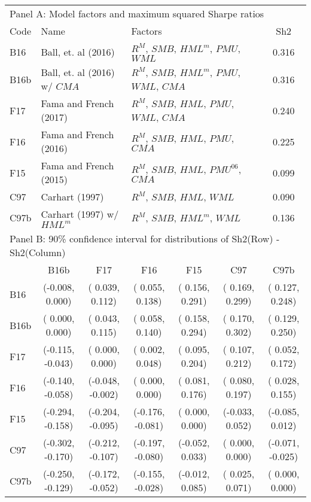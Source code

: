 
\begin{tabular}{lcccccc}
  \toprule
  \multicolumn{7}{l}{Panel A: Model factors and maximum squared Sharpe ratios} \\
  Code  & \multicolumn{2}{l}{Name}                         & \multicolumn{3}{l}{Factors}                                   & Sh2   \\
  B16   & \multicolumn{2}{l}{Ball, et. al (2016)}          & \multicolumn{3}{l}{$R^M$, $SMB$, $HML^m$, $PMU$, $WML$}        & 0.316 \\
  B16b  & \multicolumn{2}{l}{Ball, et. al (2016) w/ $CMA$} & \multicolumn{3}{l}{$R^M$, $SMB$, $HML^m$, $PMU$, $WML$, $CMA$} & 0.316 \\
  F17   & \multicolumn{2}{l}{Fama and French (2017)}       & \multicolumn{3}{l}{$R^M$, $SMB$, $HML$, $PMU$, $WML$, $CMA$}   & 0.240 \\
  F16   & \multicolumn{2}{l}{Fama and French (2016)}       & \multicolumn{3}{l}{$R^M$, $SMB$, $HML$, $PMU$, $CMA$}          & 0.225 \\
  F15   & \multicolumn{2}{l}{Fama and French (2015)}       & \multicolumn{3}{l}{$R^M$, $SMB$, $HML$, $PMU^{06}$, $CMA$}     & 0.099 \\
  C97   & \multicolumn{2}{l}{Carhart (1997)}               & \multicolumn{3}{l}{$R^M$, $SMB$, $HML$, $WML$}                 & 0.090 \\
  C97b  & \multicolumn{2}{l}{Carhart (1997) w/ $HML^m$}    & \multicolumn{3}{l}{$R^M$, $SMB$, $HML^m$, $WML$}               & 0.136 \\
  \midrule
  \multicolumn{7}{l}{Panel B: 90\% confidence interval for distributions of Sh2(Row) - Sh2(Column)} \\
        &        B16b      &        F17       &        F16       &        F15       &        C97       &        C97b      \\
  B16   & (-0.008,  0.000) & ( 0.039,  0.112) & ( 0.055,  0.138) & ( 0.156,  0.291) & ( 0.169,  0.299) & ( 0.127,  0.248) \\
  B16b  & ( 0.000,  0.000) & ( 0.043,  0.115) & ( 0.058,  0.140) & ( 0.158,  0.294) & ( 0.170,  0.302) & ( 0.129,  0.250) \\
  F17   & (-0.115, -0.043) & ( 0.000,  0.000) & ( 0.002,  0.048) & ( 0.095,  0.204) & ( 0.107,  0.212) & ( 0.052,  0.172) \\
  F16   & (-0.140, -0.058) & (-0.048, -0.002) & ( 0.000,  0.000) & ( 0.081,  0.176) & ( 0.080,  0.197) & ( 0.028,  0.155) \\
  F15   & (-0.294, -0.158) & (-0.204, -0.095) & (-0.176, -0.081) & ( 0.000,  0.000) & (-0.033,  0.052) & (-0.085,  0.012) \\
  C97   & (-0.302, -0.170) & (-0.212, -0.107) & (-0.197, -0.080) & (-0.052,  0.033) & ( 0.000,  0.000) & (-0.071, -0.025) \\
  C97b  & (-0.250, -0.129) & (-0.172, -0.052) & (-0.155, -0.028) & (-0.012,  0.085) & ( 0.025,  0.071) & ( 0.000,  0.000) \\
  \bottomrule
\end{tabular}


